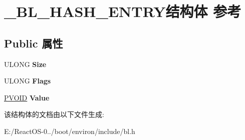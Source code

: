 \hypertarget{struct___b_l___h_a_s_h___e_n_t_r_y}{}\section{\+\_\+\+B\+L\+\_\+\+H\+A\+S\+H\+\_\+\+E\+N\+T\+R\+Y结构体 参考}
\label{struct___b_l___h_a_s_h___e_n_t_r_y}
\subsection*{Public 属性}
\begin{DoxyCompactItemize}
\item 
\mbox{\label{struct___b_l___h_a_s_h___e_n_t_r_y_a7b2fccce7036e2432c5f361bff520c0e}} 
U\+L\+O\+NG {\bfseries Size}
\item 
\mbox{\label{struct___b_l___h_a_s_h___e_n_t_r_y_a75b18283e572d34b22bd29cb4fa9325b}} 
U\+L\+O\+NG {\bfseries Flags}
\item 
\mbox{\label{struct___b_l___h_a_s_h___e_n_t_r_y_a93832acfaca8b7d3c54f8e4fb7e08487}} 
\hyperlink{interfacevoid}{P\+V\+O\+ID} {\bfseries Value}
\end{DoxyCompactItemize}


该结构体的文档由以下文件生成\+:\begin{DoxyCompactItemize}
\item 
E\+:/\+React\+O\+S-\/0../boot/environ/include/bl.\+h\end{DoxyCompactItemize}
